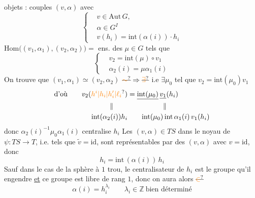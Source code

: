 objets : couples $(v,\alpha)$ avec
\[
\left\{\begin{aligned}
&v\in\mathrm{Aut}\,G,\\
&\alpha\in G^I\\
&v(h_i)=\mathrm{int}(\alpha(i))\cdot h_i
\end{aligned}\right.
\]
$\mathrm{Hom}\big((v_1,\alpha_1),(v_2,\alpha_2)\big)={}$ ens. des $\mu\in G$ tels que
\[
\left\{\begin{aligned}
&v_2=\mathrm{int}(\mu)\circ v_1\\
&\alpha_2(i)=\mu\alpha_1(i)
\end{aligned}\right.
\]
On trouve que $(v_1,\alpha_1)\simeq(v_2,\alpha_2)$ $\deleted{\unsure{\sim}}\Rightarrow\deleted{\unsure{\exists}}$   i.e $\exists\mu_0$ tel que $v_2=\mathrm{int}(\mu_0)v_1$
\[
\begin{aligned}
\text{d'où}\qquad v_2(\unsure{h^i|h_i|h'_i|\ell_i})&=\underline{\mathrm{int}(\mu_0)}\,\underline{v_1}(h_i)\\
\Vert\qquad &\hspace{5em}\Vert\\
\mathrm{int}(\alpha_2(i))h_i &\qquad\mathrm{int}(\mu_0)\,\mathrm{int}\,\alpha_1(i)\,v_1(h_i)
\end{aligned}
\]
donc $\alpha_2(i)^{-1}\mu_0\alpha_1(i)$ centralise $h_i$
Les $(v,\alpha)\in TS$ dans le noyau de $\psi:TS\to T$, i.e. tels que $\widetilde v=\mathrm{id}$, sont représentables par des $(v,\alpha)$ avec $v=\mathrm{id}$, donc
\[
h_i=\mathrm{int}\,(\alpha(i))\,h_i
\]
Sauf dans le cas de la sphère à $1$ trou,  le centralisateur de $h_i$ est le groupe qu'il engendre \uline{et} ce groupe est libre de rang $1$, donc on aura alors $\deleted{\unsure{\in}}$
\[
\alpha(i)=h_i^{\lambda_i}\qquad\lambda_i\in\mathbb Z\ \text{bien déterminé}
\]
